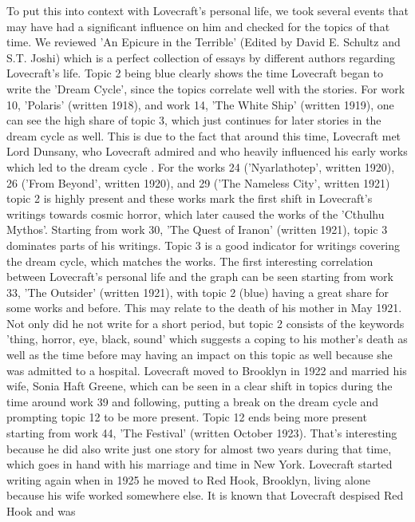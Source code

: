 To put this into context with Lovecraft's personal life, we took several events that may have had 
a significant influence on him and checked for the topics of that time. We reviewed 'An Epicure in 
the Terrible' (Edited by David E. Schultz and S.T. Joshi) \cite{schultz} which is a perfect collection of essays 
by different authors regarding Lovecraft's life. Topic 2 being blue clearly shows the time Lovecraft 
began to write the 'Dream Cycle', since the topics correlate well with the stories. For work 10, 
'Polaris' (written 1918), and work 14, 'The White Ship' (written 1919), one can see the high share 
of topic 3, which just continues for later stories in the dream cycle as well. This is due to the 
fact that around this time, Lovecraft met Lord Dunsany, who Lovecraft admired and who heavily 
influenced his early works which led to the dream cycle \cite{joshi2}. For the works 24 ('Nyarlathotep', 
written 1920), 26 ('From Beyond', written 1920), and 29 ('The Nameless City', written 1921) 
topic 2 is highly present and these works mark the first shift in Lovecraft's writings towards 
cosmic horror, which later caused the works of the 'Cthulhu Mythos'. Starting from work 30, 'The 
Quest of Iranon' (written 1921), topic 3 dominates parts of his writings. Topic 3 is a good indicator 
for writings covering the dream cycle, which matches the works. The first interesting correlation 
between Lovecraft's personal life and the graph can be seen starting from work 33, 'The Outsider' 
(written 1921), with topic 2 (blue) having a great share for some works and before. This may relate 
to the death of his mother in May 1921. Not only did he not write for a short period, but topic 2 
consists of the keywords 'thing, horror, eye, black, sound' which suggests a coping to his mother's 
death as well as the time before may having an impact on this topic as well because she was admitted 
to a hospital. Lovecraft moved to Brooklyn in 1922 and married his wife, Sonia Haft Greene, which 
can be seen in a clear shift in topics during the time around work 39 and following, putting a break 
on the dream cycle and prompting topic 12 to be more present. Topic 12 ends being more present starting 
from work 44, 'The Festival' (written October 1923). That's interesting because he did also write just 
one story for almost two years during that time, which goes in hand with his marriage and time in New 
York. Lovecraft started writing again when in 1925 he moved to Red Hook, Brooklyn, living alone 
because his wife worked somewhere else. It is known that Lovecraft despised Red Hook and was 
